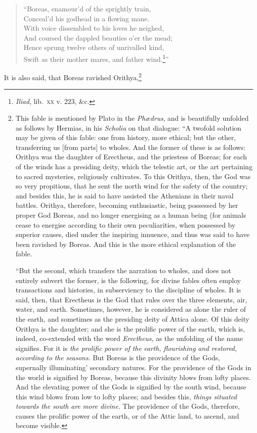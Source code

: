 \documentclass[a4paper,12pt]{article}
\begin{document}
\begin{verse}
``Boreas, enamour'd of the sprightly train,\\
Conceal'd his godhead in a flowing mane.\\
With voice dissembled to his loves he neighed,\\
And coursed the dappled beauties o'er the mead;\\
Hence sprung twelve others of unrivalled kind,\\
Swift as their mother mares, and father wind.\footnote{\textit{Iliad},
lib.~\textsc{xx} v. 223, \&c.}''
\end{verse}

\noindent It is also said, that Boreas ravished Orithya,\footnote{This fable is
mentioned by Plato in the \textit{Ph{\ae}drus}, and is beautifully unfolded as
follows by Hermias, in his \textit{Scholia} on that dialogue: ``A twofold
solution may be given of this fable: one from history, more ethical; but the
other, transferring us [from parts] to wholes. And the former of these is as
follows: Orithya was the daughter of Erectheus, and the priestess of Boreas;
for each of the winds has a presiding deity, which the telestic art, or the art
pertaining to sacred mysteries, religiously cultivates. To this Orithya, then,
the God was so very propitious, that he sent the north wind for the safety of
the country; and besides this, he is said to have assisted the Athenians in
their naval battles. Orithya, therefore, becoming enthusiastic, being possessed
by her proper God Boreas, and no longer energising as a human being (for
animals cease to energise according to their own peculiarities, when possessed
by superior causes, died under the inspiring innuence, and thus was said to
have been ravished by Boreas. And this is the more ethical explanation of the
fable.

``But the second, which transfers the narration to wholes, and does not
entirely subvert the former, is the following, for divine fables often employ
transactions and histories, in subserviency to the discipline of wholes. It is
said, then, that Erectheus is the God that rules over the three elements, air,
water, and earth. Sometimes, however, he is considered as alone the ruler of
the earth, and sometimes as the presiding deity of Attica alone. Of this deity
Orithya is the daughter; and she is the prolific power of the earth, which is,
indeed, co-extended with the word \textit{Erectheus,} as the unfolding of the
name signifies. For it is \textit{the prolific power of the earth, flourishing
and restored, according to the seasons.} But Boreas is the providence of the
Gods, supernally illuminating' secondary natures. For the providence of the
Gods in the world is signified by Boreas, because this divinity blows from
lofty places. And the elevating power of the Gods is signified by the south
wind, because this wind blows from low to lofty places; and besides this,
\textit{things situated towards the south are more divine.} The providence of
the Gods, therefore, causes the prolific power of the earth, or of the Attic
land, to ascend, and become visible.

}
\end{document}
